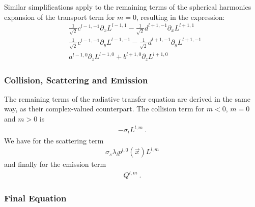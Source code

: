 Similar simplifications apply to the remaining terms of the spherical harmonics expansion of the transport term for $m=0$, resulting in the expression:
\begin{align}
\label{eq:pn_rvalued_transport_m0}
&
\frac{1}{\sqrt{2}}c^{{l-1,-1}}\partial_x L^{{l-1,1}}
-\frac{1}{\sqrt{2}}d^{{l+1,-1}}\partial_x L^{{l+1,1}}
\\&
\frac{1}{\sqrt{2}}c^{{l-1,-1}}\partial_y L^{{l-1,-1}}
-\frac{1}{\sqrt{2}}d^{{l+1,-1}}\partial_y L^{{l+1,-1}}
\\&
a^{{l-1,0}}\partial_z L^{{l-1,0}}
+b^{{l+1,0}}\partial_z L^{{l+1,0}}
\end{align}

\subsubsection*{Collision, Scattering and Emission}

The remaining terms of the radiative transfer equation are derived in the same way, as their complex-valued counterpart. The collision term for $m < 0$, $m=0$ and $m > 0$ is
\begin{align}
\label{eq:pn_rvalued_transport_collision}
-\sigma_t L^{l,m}
\ .
\end{align}
We have for the scattering term
\begin{align}
\label{eq:pn_rvalued_transport_scattering}
\sigma_s\lambda_{l}p^{l,0}\left(\vec{x}\right)L^{l,m}
\end{align}
and finally for the emission term
\begin{align}
\label{eq:pn_rvalued_transport_emission}
Q^{l,m}
\ .
\end{align}

\subsubsection*{Final Equation}

